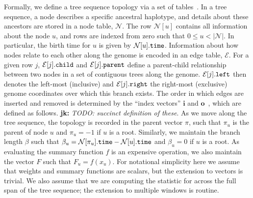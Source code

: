 \documentclass{article}
\newcommand{\Nt}{\mathcal{N}}  %
\newcommand{\Et}{\mathcal{E}}  %
\newcommand{\prop}[1]{.\mbox{\texttt{#1}}} %
\newcommand{\indexin}[0]{\ensuremath{\mathbf{i}}}
\newcommand{\indexout}[0]{\ensuremath{\mathbf{o}}}
\newcommand{\jk}[1]{{\color{red}\textbf{jk:} \it #1}}
\begin{document}
Formally, we define a tree sequence topology via a set of
tables~\citep{kelleher2018efficient}. In a tree sequence, a node
describes a specific ancestral haplotype, and details about these
ancestors are stored in a node table, $\Nt$. The row $\Nt[u]$
contains all information about the node $u$, and rows
are indexed from zero such that $0 \leq u < |\Nt|$.
In particular, the birth time for $u$ is given by
$\Nt[u]\prop{time}$. Information about how nodes relate to each
other along the genome is encoded in an edge table, $\Et$.
For a given row $j$, $\Et[j]\prop{child}$ and $\Et[j]\prop{parent}$
define a parent-child relationship between two nodes in a set of
contiguous trees along the genome. $\Et[j]\prop{left}$ then denotes
the left-most (inclusive) and $\Et[j]\prop{right}$ the right-most
(exclusive) genome coordinates over which this branch exists.
The order in which edges are inserted and removed is determined
by the ``index vectors'' $\indexin$ and $\indexout$~\citep{kelleher2016efficient},
which are defined as follows. \jk{TODO: succinct definition of these}.
As we move along the tree sequence, the topology is recorded in the
parent vector $\pi$, such that $\pi_u$ is the parent of node $u$
and $\pi_u = -1$ if $u$ is a root. Similarly, we maintain the
branch length $\beta$ such that
$\beta_u = \Nt[\pi_u]\prop{time} - \Nt[u]\prop{time}$ and
$\beta_u = 0$ if $u$ is a root. As evaluating the summary function
$f$ is an expensive operation, we also maintain the vector $F$
such that $F_u = f(x_u)$. For notational simplicity here we assume
that weights and summary functions are scalars, but the extension to
vectors is trivial. We also assume that we are computing the statistic
for across the full span of the tree sequence; the extension to multiple
windows is routine.
\end{document}
